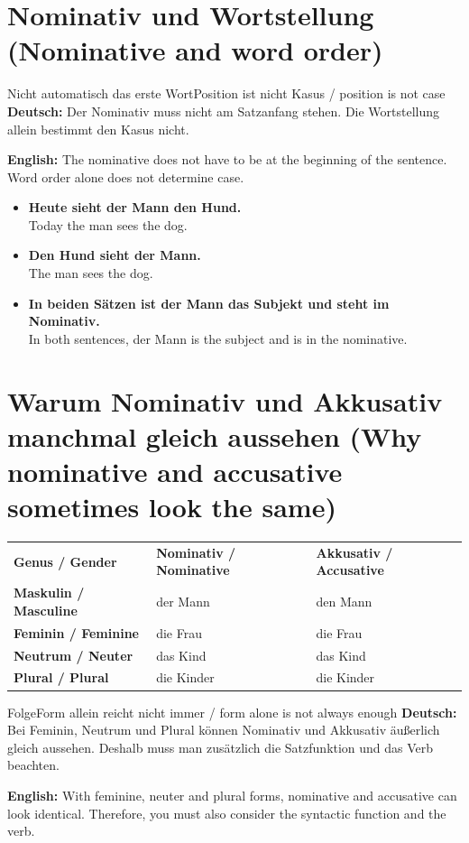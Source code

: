 \documentclass[a4paper,11pt]{article}
\newcommand{\GermanText}[1]{\textbf{Deutsch: }#1\par}
\newcommand{\EnglishText}[1]{{\small\color{SoftGray}\textbf{English: }#1\par}}
\newcommand{\ExampleItem}[2]{\item \textbf{#1}\\{\small\color{SoftGray}#2}}
\begin{document}
\section{Nominativ und Wortstellung \textnormal{(Nominative and word order)}}

\begin{grammarentry}{Nicht automatisch das erste Wort}{Position ist nicht Kasus / position is not case}
\GermanText{Der Nominativ muss nicht am Satzanfang stehen. Die Wortstellung allein bestimmt den Kasus nicht.}
\EnglishText{The nominative does not have to be at the beginning of the sentence. Word order alone does not determine case.}
\end{grammarentry}

\begin{exbox}
\begin{itemize}
\ExampleItem{Heute sieht der Mann den Hund.}{Today the man sees the dog.}
\ExampleItem{Den Hund sieht der Mann.}{The man sees the dog.}
\ExampleItem{In beiden Sätzen ist der Mann das Subjekt und steht im Nominativ.}{In both sentences, der Mann is the subject and is in the nominative.}
\end{itemize}
\end{exbox}

\section{Warum Nominativ und Akkusativ manchmal gleich aussehen \textnormal{(Why nominative and accusative sometimes look the same)}}

\begin{longtable}{>{\bfseries}p{4.0cm}|>{\centering\arraybackslash}p{4.8cm}>{\centering\arraybackslash}p{4.8cm}}
\rowcolor{HeaderBlueDark}
\color{white}\textbf{Genus / Gender} &
\color{white}\textbf{Nominativ / Nominative} &
\color{white}\textbf{Akkusativ / Accusative} \\
Maskulin / Masculine & der Mann & den Mann \\
Feminin / Feminine & die Frau & die Frau \\
Neutrum / Neuter & das Kind & das Kind \\
Plural / Plural & die Kinder & die Kinder \\
\end{longtable}

\begin{grammarentry}{Folge}{Form allein reicht nicht immer / form alone is not always enough}
\GermanText{Bei Feminin, Neutrum und Plural können Nominativ und Akkusativ äußerlich gleich aussehen. Deshalb muss man zusätzlich die Satzfunktion und das Verb beachten.}
\EnglishText{With feminine, neuter and plural forms, nominative and accusative can look identical. Therefore, you must also consider the syntactic function and the verb.}
\end{grammarentry}
\end{document}
